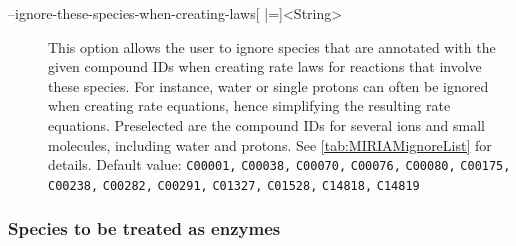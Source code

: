 \begin{description}
\item[--ignore-these-species-when-creating-laws{[} |={]}<String>]
  This option allows the user to ignore species that are annotated with the
  given compound \acp{ID} when creating rate laws for reactions
  that involve these species. For instance, water or single protons
  can often be ignored when creating rate equations, hence simplifying
  the resulting rate equations. Preselected are the \KEGG \citep{Kanehisa2000a}
  compound \acp{ID} for several ions and small molecules, including water and
  protons. See \vref{tab:MIRIAMignoreList} for details.
  Default value: \texttt{C00001,} \texttt{C00038,} \texttt{C00070,}
  \texttt{C00076,} \texttt{C00080,} \texttt{C00175,} \texttt{C00238,}
  \texttt{C00282,} \texttt{C00291,} \texttt{C01327,} \texttt{C01528,}
  \texttt{C14818,} \texttt{C14819}
\end{description}

\subsubsection{Species to be treated as enzymes}

